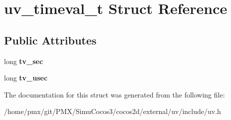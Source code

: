 \hypertarget{structuv__timeval__t}{}\section{uv\+\_\+timeval\+\_\+t Struct Reference}
\label{structuv__timeval__t}
\subsection*{Public Attributes}
\begin{DoxyCompactItemize}
\item 
\mbox{\label{structuv__timeval__t_a1d59b517f54431c86af88f55bbcec2b3}} 
long {\bfseries tv\+\_\+sec}
\item 
\mbox{\label{structuv__timeval__t_a01e91a67c093b4393a343944766bc2d9}} 
long {\bfseries tv\+\_\+usec}
\end{DoxyCompactItemize}


The documentation for this struct was generated from the following file\+:\begin{DoxyCompactItemize}
\item 
/home/pmx/git/\+P\+M\+X/\+Simu\+Cocos3/cocos2d/external/uv/include/uv.\+h\end{DoxyCompactItemize}
